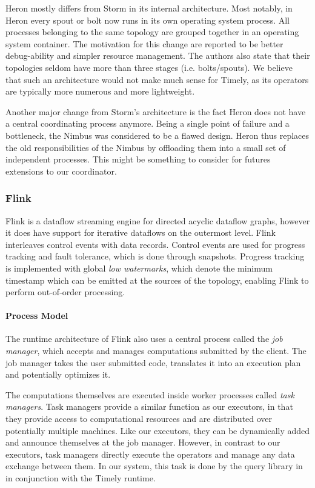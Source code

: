 Heron mostly differs from Storm in its internal architecture. Most notably, in
Heron every spout or bolt now runs in its own operating system process. All processes
belonging to the same topology are grouped together in an operating system container.
The motivation for this change are reported to be better debug-ability
and simpler resource management. The authors also state that their topologies
seldom have more than three stages (i.e. bolts/spouts). We believe that such
an architecture would not make much sense for Timely, as its operators are typically
more numerous and more lightweight.

Another major change from Storm's architecture
is the fact Heron does not have a central coordinating process anymore. Being
a single point of failure and a bottleneck, the Nimbus was considered to be a
flawed design. Heron thus replaces the old responsibilities of the Nimbus by
offloading them into a small set of independent processes. This might be something
to consider for futures extensions to our coordinator.

\subsubsection{Flink}

Flink \cite{flink} is a dataflow streaming engine for directed acyclic
dataflow graphs, however it does have support for iterative dataflows on the
outermost level. Flink interleaves control events with data records. Control
events are used for progress tracking and fault tolerance, which is done through
snapshots. Progress tracking is implemented with global \emph{low watermarks}, which
denote the minimum timestamp which can be emitted at the sources of the
topology, enabling Flink to perform out-of-order processing.

\paragraph{Process Model}

The runtime architecture of Flink also uses a central process called the
\emph{job manager}, which accepts and manages computations submitted by
the client. The job manager takes the user submitted code, translates it into
an execution plan and potentially optimizes it.

The computations themselves are executed inside worker processes called
\emph{task managers}. Task managers provide a similar function as our executors, in that
they provide access to computational resources and are distributed over
potentially multiple machines. Like our executors, they can be dynamically added and announce themselves at the
job manager. However, in contrast to our executors, task managers directly execute the
operators and manage any data exchange between them. In our system, this task is done by the
query library in in conjunction with the Timely runtime.


